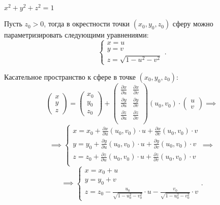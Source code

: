 \begin{example}
    $x^2 + y^2 + z^2 = 1$

    Пусть $z_0 > 0$, тогда в окрестности точки $(x_0,y_0,z_0)$ сферу можно параметризировать следующими уравнениями:
    \[
        \left\{\begin{array}{l}
            x = u \\
            y = v \\
            z = \sqrt{1 - u^2 - v^2}
        \end{array}\right..
    \]

    Касательное пространство к сфере в точке $(x_0,y_0,z_0)$:
    \[
        \left(\begin{matrix}
                x \\
                y \\
                z
            \end{matrix}\right) = \left(\begin{matrix}
                x_0 \\
                y_0 \\
                z_0
            \end{matrix}\right) + \left(\begin{matrix}
                \frac{\partial x}{\partial u} & \frac{\partial x}{\partial v} \\
                \frac{\partial y}{\partial u} & \frac{\partial y}{\partial v} \\
                \frac{\partial z}{\partial u} & \frac{\partial z}{\partial v} \\
            \end{matrix}\right) (u_0,v_0) \cdot \left(\begin{matrix}
                u \\
                v
            \end{matrix}\right) \implies
    \]
    \[
        \implies \left\{\begin{array}{l}
            x = x_0 + \frac{\partial x}{\partial u}(u_0,v_0) \cdot u + \frac{\partial x}{\partial v}(u_0,v_0)\cdot v \\
            y = y_0 + \frac{\partial y}{\partial u}(u_0,v_0) \cdot u + \frac{\partial y}{\partial v}(u_0,v_0)\cdot v \\
            z = z_0 + \frac{\partial z}{\partial u}(u_0,v_0) \cdot u + \frac{\partial z}{\partial v}(u_0,v_0)\cdot v \\
        \end{array}\right. \implies
    \]
    \[
        \implies \left\{\begin{array}{l}
            x = x_0 + u \\
            y = y_0 + v \\
            z = z_0 - \frac{u_0}{\sqrt{1 - u_0^2 - v_0^2}}\cdot u - \frac{v_0}{\sqrt{1 - u_0^2 - v_0^2}}\cdot v
        \end{array}\right..
    \]
\end{example}


